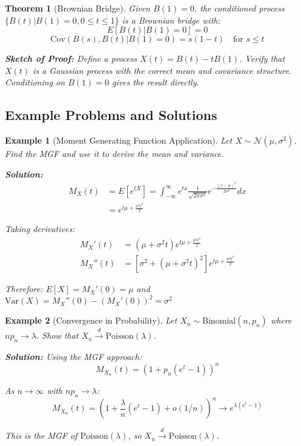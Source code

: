 \documentclass[12pt,a4paper]{article}
\newtheorem{theorem}{Theorem}[section]
\newtheorem{example}{Example}[section]
\theoremstyle{remark}
\begin{document}
\begin{theorem}[Brownian Bridge]
Given $B(1) = 0$, the conditioned process $\{B(t) | B(1) = 0, 0 \leq t \leq 1\}$ is a Brownian bridge with:
$$E[B(t) | B(1) = 0] = 0$$
$$\text{Cov}(B(s), B(t) | B(1) = 0) = s(1-t) \quad \text{for } s \leq t$$

\textbf{Sketch of Proof:} Define a process $X(t) = B(t) - tB(1)$. Verify that $X(t)$ is a Gaussian process with the correct mean and covariance structure. Conditioning on $B(1)=0$ gives the result directly.
\end{theorem}

\subsection{Example Problems and Solutions}

\begin{example}[Moment Generating Function Application]
Let $X \sim \mathcal{N}(\mu, \sigma^2)$. Find the MGF and use it to derive the mean and variance.

\textbf{Solution:}
\begin{align}
M_X(t) &= E[e^{tX}] = \int_{-\infty}^{\infty} e^{tx} \frac{1}{\sqrt{2\pi\sigma^2}} e^{-\frac{(x-\mu)^2}{2\sigma^2}} dx\\
&= e^{t\mu + \frac{\sigma^2 t^2}{2}}
\end{align}

Taking derivatives:
\begin{align}
M_X'(t) &= (\mu + \sigma^2 t) e^{t\mu + \frac{\sigma^2 t^2}{2}}\\
M_X''(t) &= [\sigma^2 + (\mu + \sigma^2 t)^2] e^{t\mu + \frac{\sigma^2 t^2}{2}}
\end{align}

Therefore: $E[X] = M_X'(0) = \mu$ and $\text{Var}(X) = M_X''(0) - (M_X'(0))^2 = \sigma^2$
\end{example}

\begin{example}[Convergence in Probability]
Let $X_n \sim \text{Binomial}(n, p_n)$ where $np_n \to \lambda$. Show that $X_n \stackrel{d}{\to} \text{Poisson}(\lambda)$.

\textbf{Solution:}
Using the MGF approach:
$$M_{X_n}(t) = (1 + p_n(e^t - 1))^n$$

As $n \to \infty$ with $np_n \to \lambda$:
$$M_{X_n}(t) = \left(1 + \frac{\lambda}{n}(e^t - 1) + o(1/n)\right)^n \to e^{\lambda(e^t - 1)}$$

This is the MGF of $\text{Poisson}(\lambda)$, so $X_n \stackrel{d}{\to} \text{Poisson}(\lambda)$.
\end{example}
\end{document}
